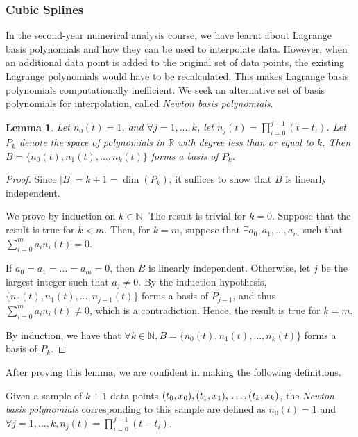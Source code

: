 \documentclass[a4paper,11pt,titlepage]{article}
\theoremstyle{definition}
\theoremstyle{plain}
\newtheorem{lemma}[theorem]{Lemma}
\theoremstyle{remark}
\begin{document}
\subsubsection{Cubic Splines}

In the second-year numerical analysis course, we have learnt about Lagrange basis polynomials and how they can be used to interpolate data. However, when an additional data point is added to the original set of data points, the existing Lagrange polynomials would have to be recalculated. This makes Lagrange basis polynomials computationally inefficient. We seek an alternative set of basis polynomials for interpolation, called \textit{Newton basis polynomials}.

\begin{lemma}
    Let $n_0(t)=1$, and $\forall j=1,...,k$, let $n_j(t)=\prod_{i=0}^{j-1}(t-t_i)$. Let $P_k$ denote the space of polynomials in $\mathbb{R}$ with  degree less than or equal to $k$. Then $B=\{n_0(t),n_1(t),...,n_k(t)\}$ forms a basis of $P_k$.
\end{lemma}

\begin{proof}
    Since $|B|=k+1=\dim(P_k)$, it suffices to show that $B$ is linearly independent.
    
    We prove by induction on $k\in\mathbb{N}$. The result is trivial for $k=0$. Suppose that the result is true for $k<m$. Then, for $k=m$, suppose that $\exists a_0,a_1,\dots,a_m$ such that $\sum_{i=0}^ma_in_i(t)=0$.

    If $a_0=a_1=\dots=a_m=0$, then $B$ is linearly independent. Otherwise, let $j$ be the largest integer such that $a_j\neq0$. By the induction hypothesis, $\{n_0(t),n_1(t),\dots,n_{j-1}(t)\}$ forms a basis of $P_{j-1}$, and thus $\sum_{i=0}^ma_in_i(t)\neq0$, which is a contradiction. Hence, the result is true for $k=m$.

    By induction, we have that $\forall k\in\mathbb{N}, B=\{n_0(t),n_1(t),\dots,n_k(t)\}$ forms a basis of $P_k$.
\end{proof}

After proving this lemma, we are confident in making the following definitions.

Given a sample of $k+1$ data points
$(t_0,x_0), (t_1,x_1), \\\dots, (t_k,x_k)$, the \textit{Newton basis polynomials} corresponding to this sample are defined as $n_0(t)=1$ and $\forall j=1,...,k, n_j(t)=\prod_{i=0}^{j-1}(t-t_i)$.
\end{document}
